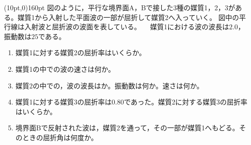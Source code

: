 \hakosyokika
\item
    \begin{mawarikomi}(10pt,0){160pt}{}
    図のように，平行な境界面A，Bで接した3種の媒質1，2，3がある。媒質1から入射した平面波の一部が屈折して媒質2へ入っていく。
    図中の平行線は入射波と屈折波の波面を表している。
    　媒質1における波の波長は$2.0$，振動数は$25$である。
        \begin{enumerate}
            \item 媒質1に対する媒質2の屈折率はいくらか。
            \item 媒質1の中での波の速さは何か。
            \item 媒質2の中での，波の波長はか。振動数は何か。速さは何か。
            \item 媒質1に対する媒質3の屈折率は0.80であった。媒質2に対する媒質3の屈折率はいくらか。
            \item 境界面Bで反射された波は，媒質2を通って，その一部が媒質1へもどる。そのときの屈折角は何度か。
        \end{enumerate}
    \end{mawarikomi}